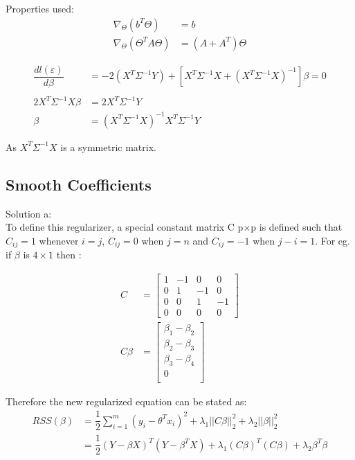 \documentclass[paper=a4, fontsize=11pt]{scrartcl} %
\numberwithin{equation}{section} %
\numberwithin{figure}{section} %
\numberwithin{table}{section} %
\begin{document}
Properties used:
\begin{align*}
\nabla_{\Theta}(b^{T}\Theta) &= b\\
\nabla_{\Theta}(\Theta^{T}A\Theta) &= (A + A^{T})\Theta
\end{align*}

\begin{align*}
\dfrac{dl(\varepsilon)}{d\beta} &= -2(X^{T}\Sigma^{-1}Y) + [X^{T}\Sigma^{-1}X + (X^{T}\Sigma^{-1}X)^{-1}]\beta = 0\\\\
2X^{T}\Sigma^{-1}X\beta &= 2X^{T}\Sigma^{-1}Y\\
\beta &= (X^{T}\Sigma^{-1}X)^{-1}X^{T}\Sigma^{-1}Y
\end{align*}

As \begin{math}X^{T}\Sigma^{-1}X\end{math} is a symmetric matrix.
\endgroup

\subsection{Smooth Coefficients}
\begingroup
Solution a:\\
To define this regularizer, a special constant matrix C p$\times$p is defined such that $C_{ij}=1$ whenever $i=j$, $C_{ij}=0$ when $j=n$ and $C_{ij}=-1$ when $j-i=1$. For eg. if $\beta$ is $4\times1$ then :

\begin{align*}
C &= 
\begin{bmatrix}
1 & -1 & 0 & 0\\
0 & 1 & -1 & 0\\
0 & 0 & 1 & -1\\
0 & 0 & 0 & 0
\end{bmatrix}\\
C\beta &= 
\begin{bmatrix}
\beta_{1}-\beta_{2}\\
\beta_{2}-\beta_{3}\\
\beta_{3}-\beta_{4}\\
0\\
\end{bmatrix}
\end{align*}

Therefore the new regularized equation can be stated as:
\begin{align*}
RSS(\beta) &= \dfrac{1}{2}\sum_{i=1}^{m}(y_{i}-\theta^{T}x_{i})^{2} + \lambda_{1}||C\beta||_{2}^{2} + \lambda_{2}||\beta||_{2}^{2}\\
&= \dfrac{1}{2}(Y-\beta X)^{T}(Y-\beta^{T} X) + \lambda_{1}(C\beta)^{T}(C\beta) + \lambda_{2}\beta^{T} \beta
\end{align*}
\end{document}

